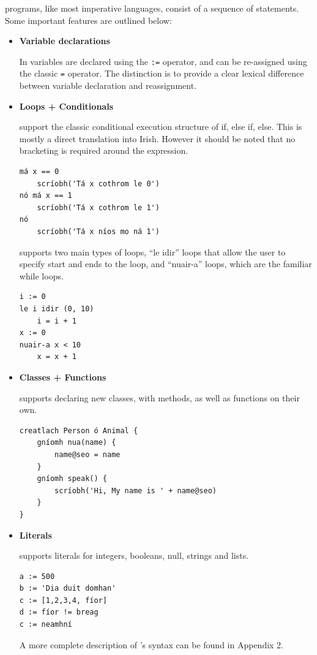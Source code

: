 \Setanta{} programs, like most imperative languages, consist of a sequence of statements. Some important \Setanta{} features are outlined below:
\begin{itemize}
    \item \textbf{Variable declarations}

        In \Setanta{} variables are declared using the \verb|:=| operator, and can be re-assigned using the classic \verb|=| operator. The distinction is to provide a clear lexical difference between variable declaration and reassignment.
    \item \textbf{Loops + Conditionals}

        \Setanta{} support the classic conditional execution structure of if, else if, else. This is mostly a direct translation into Irish. However it should be noted that no bracketing is required around the expression.

            \begin{lstlisting}[language=setanta, frame=single, caption=Setanta conditionals]
má x == 0
    scríobh('Tá x cothrom le 0')
nó má x == 1
    scríobh('Tá x cothrom le 1')
nó
    scríobh('Tá x níos mo ná 1')
            \end{lstlisting}

            \Setanta{} supports two main types of loops, ``le idir'' loops that allow the user to specify start and ends to the loop, and ``nuair-a'' loops, which are the familiar while loops.

            \begin{lstlisting}[language=setanta, frame=single, caption=Setanta loops]
i := 0
le i idir (0, 10)
    i = i + 1
x := 0
nuair-a x < 10
    x = x + 1
            \end{lstlisting}
        \item \textbf{Classes + Functions}

            \Setanta{} supports declaring new classes, with methods, as well as functions on their own.
            \begin{lstlisting}[language=setanta, frame=single, caption=Setanta classes]
creatlach Person ó Animal {
    gníomh nua(name) {
        name@seo = name
    }
    gníomh speak() {
        scríobh('Hi, My name is ' + name@seo)
    }
}
            \end{lstlisting}
        \item \textbf{Literals}

            \Setanta{} supports literals for integers, booleans, null, strings and lists.
            \begin{lstlisting}[language=setanta, frame=single, caption=Setanta literals]
a := 500
b := 'Dia duit domhan'
c := [1,2,3,4, fíor]
d := fíor != breag
c := neamhní
            \end{lstlisting}

    A more complete description of \Setanta{}'s syntax can be found in Appendix 2.
\end{itemize}

